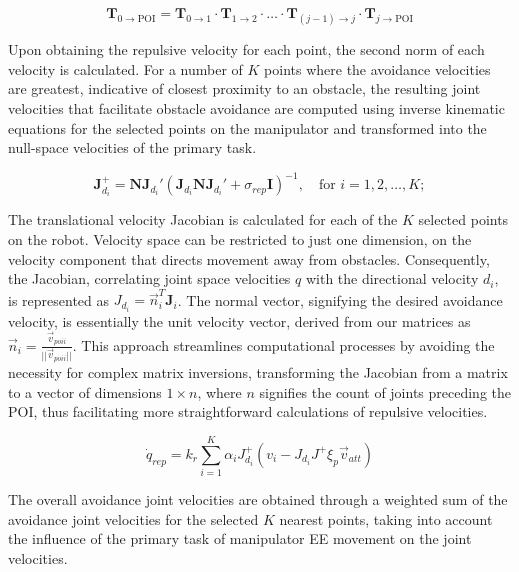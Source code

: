 \documentclass[letterpaper, 10 pt, conference]{ieeeconf}  %
\begin{document}
\begin{equation}
	\mathbf{T}_{0 \rightarrow \text{POI}} = \mathbf{T}_{0 \rightarrow 1} \cdot \mathbf{T}_{1 \rightarrow 2} \cdot \ldots \cdot \mathbf{T}_{(j-1) \rightarrow j} \cdot \mathbf{T}_{j \rightarrow \text{POI}}	
	\label{eq:transformations}
\end{equation}

Upon obtaining the repulsive velocity for each point, the second norm of each velocity is calculated. For a number of $K$ points where the avoidance velocities are greatest, indicative of closest proximity to an obstacle, the resulting joint velocities that facilitate obstacle avoidance are computed using inverse kinematic equations for the selected points on the manipulator and transformed into the null-space velocities of the primary task.

\begin{equation}
	\mathbf{J}_{d_i}^{+} = \mathbf{N} \mathbf{J}_{d_i}' (\mathbf{J}_{d_i} \mathbf{N} \mathbf{J}_{d_i}' + \sigma_{rep} \mathbf{I})^{-1}, \quad \text{for } i = 1, 2, \ldots, K;
\end{equation}

The translational velocity Jacobian is calculated for each of the $K$ selected points on the robot. Velocity space can be restricted to just one dimension, on the velocity component that directs movement away from obstacles. Consequently, the Jacobian, correlating joint space velocities \(q\) with the directional velocity \(d_i\), is represented as \(J_{d_i} = \vec{n}_i^T \mathbf{J}_i\). The normal vector, signifying the desired avoidance velocity, is essentially the unit velocity vector, derived from our matrices as \(\vec{n}_{i} = \frac{\vec{v}_{poi i}}{||\vec{v}_{poi i}||}\). This approach streamlines computational processes by avoiding the necessity for complex matrix inversions, transforming the Jacobian from a matrix to a vector of dimensions \(1 \times n\), where \(n\) signifies the count of joints preceding the POI, thus facilitating more straightforward calculations of repulsive velocities.

\begin{equation}
	\dot{q}_{rep} = k_r \sum_{i=1}^{K} \alpha_i J_{d_i}^{+} \left(v_i - J_{d_i} J^{+} \xi_{p} \vec{v}_{att}\right)
\end{equation}

The overall avoidance joint velocities are obtained through a weighted sum of the avoidance joint velocities for the selected \(K\) nearest points, taking into account the influence of the primary task of manipulator EE movement on the joint velocities.
\end{document}
